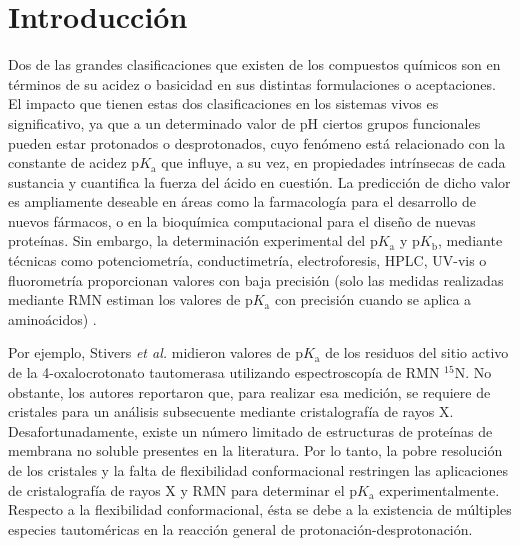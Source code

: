 \documentclass[12pt]{article}
\begin{document}
	\clearpage
	
	
	
	\section{Introducci\'{o}n}
	
	
	
	Dos de las grandes clasificaciones que existen de los compuestos qu\'{i}micos son en t\'{e}rminos de su acidez o basicidad en sus distintas formulaciones o aceptaciones. El impacto que tienen estas dos clasificaciones en los sistemas vivos es significativo, ya que a un determinado valor de pH ciertos grupos funcionales pueden estar protonados o desprotonados, cuyo fen\'{o}meno est\'{a} relacionado con la constante de  acidez $\mathrm{p}K_{\mathrm{a}}$ que influye, a su vez, en propiedades intr\'{i}nsecas de cada sustancia y cuantifica la fuerza del \'{a}cido en cuesti\'{o}n. La predicci\'{o}n de dicho valor es ampliamente deseable en \'{a}reas como la farmacolog\'{i}a para el desarrollo de nuevos f\'{a}rmacos, o en la bioqu\'{i}mica computacional para el diseño de nuevas prote\'{i}nas.
	Sin embargo, la determinaci\'{o}n experimental del $\mathrm{p}K_{\mathrm{a}}$ y $\mathrm{p}K_{\mathrm{b}}$, mediante t\'{e}cnicas como
	potenciometr\'{i}a, conductimetr\'{i}a, electroforesis, HPLC, UV-vis o 
	fluorometr\'{i}a proporcionan valores con baja precisi\'{o}n (solo las medidas realizadas mediante RMN estiman los valores de $\mathrm{p}K_{\mathrm{a}}$ con precisi\'{o}n cuando se aplica a amino\'{a}cidos) \cite{Haslak2021}.
	
	Por ejemplo, Stivers \textit{et al.} \cite{Stivers1996} midieron valores de 
	$\mathrm{p}K_{\mathrm{a}}$ de los residuos del sitio activo de la 4-oxalocrotonato tautomerasa
	utilizando espectroscop\'{i}a de RMN $^{15}$N. 
	No obstante, los autores reportaron que, para realizar esa medici\'{o}n, se requiere de cristales para un an\'{a}lisis subsecuente mediante cristalograf\'{i}a de rayos X. Desafortunadamente, existe un n\'{u}mero limitado de estructuras de prote\'{i}nas de membrana no soluble presentes en la literatura. Por lo tanto, la pobre resoluci\'{o}n de los cristales y la falta de flexibilidad conformacional restringen las aplicaciones de cristalograf\'{i}a de rayos X y RMN para determinar el $\mathrm{p}K_{\mathrm{a}}$ experimentalmente.
	Respecto a la flexibilidad conformacional, \'{e}sta se debe a la existencia de m\'{u}ltiples 
	especies tautom\'{e}ricas en la reacci\'{o}n general de protonaci\'{o}n-desprotonaci\'{o}n.
	
\end{document}

